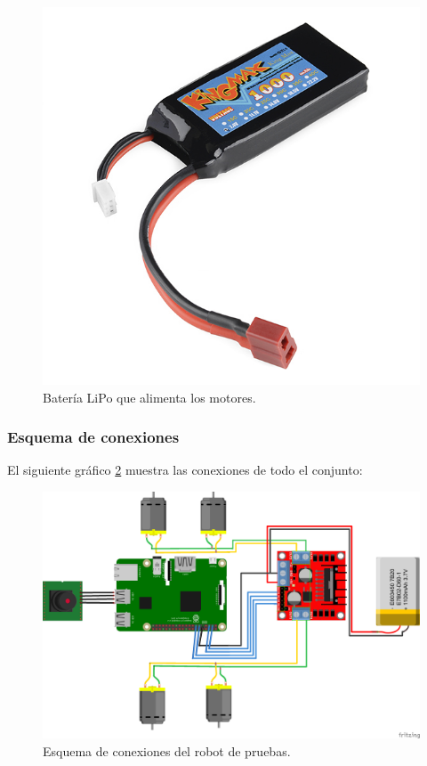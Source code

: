 \begin{figure}[H]
  \begin{center}
    \includegraphics[scale=0.3]{imagenes/robot/bateria-lipo.jpg}
  \end{center}
  \caption{Batería LiPo que alimenta los motores.}
  \label{figura:rpi-modulo-bateria}
\end{figure}



\subsubsection{Esquema de conexiones}

El siguiente gráfico \ref{diagrama:esquema-conexiones} muestra las conexiones de todo el conjunto:

\begin{figure}[H]
  \includegraphics[scale=0.55]{imagenes/robot/robot-esquema2.png}
  \caption{Esquema de conexiones del robot de pruebas.}
  \label{diagrama:esquema-conexiones}
\end{figure}


